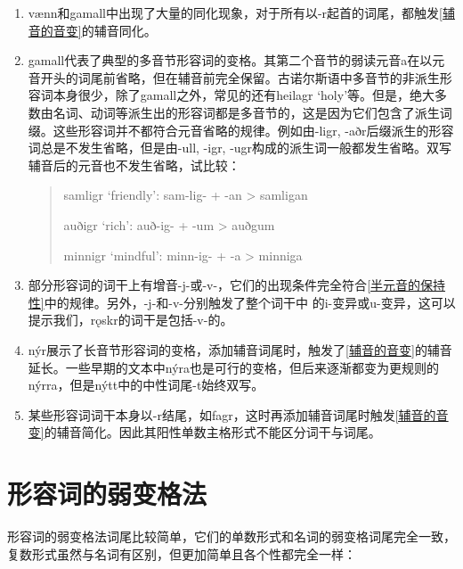 \begin{enumerate}
    \item
          vænn和gamall中出现了大量的同化现象，对于所有以-r起首的词尾，都触发\ref{辅音的音变}的辅音同化。
    \item
          gamall代表了典型的多音节形容词的变格。其第二个音节的弱读元音a在以元音开头的词尾前省略，但在辅音前完全保留。古诺尔斯语中多音节的非派生形容词本身很少，除了gamall之外，常见的还有heilagr `holy'等。但是，绝大多数由名词、动词等派生出的形容词都是多音节的，这是因为它们包含了派生词缀。这些形容词并不都符合元音省略的规律。例如由-ligr, -aðr后缀派生的形容词总是不发生省略，但是由-ull, -igr, -ugr构成的派生词一般都发生省略。双写辅音后的元音也不发生省略，试比较：

          \begin{quote}
              samligr `friendly': sam-lig- + -an > samligan

              auðigr `rich': auð-ig- + -um > auðgum

              minnigr `mindful': minn-ig- + -a > minniga
          \end{quote}

    \item
          部分形容词的词干上有增音-j-或-v-，它们的出现条件完全符合\ref{半元音的保持性}中的规律。另外，-j-和-v-分别触发了整个词干中
          的i-变异或u-变异，这可以提示我们，rǫskr的词干是包括-v-的。
    \item
          nýr展示了长音节形容词的变格，添加辅音词尾时，触发了\ref{辅音的音变}的辅音延长。一些早期的文本中nýra也是可行的变格，但后来逐渐都变为更规则的nýrra，但是nýtt中的中性词尾-t始终双写。
    \item
          某些形容词词干本身以-r结尾，如fagr，这时再添加辅音词尾时触发\ref{辅音的音变}的辅音简化。因此其阳性单数主格形式不能区分词干与词尾。
\end{enumerate}

\section{形容词的弱变格法}\label{形容词的弱变格法}

形容词的弱变格法词尾比较简单，它们的单数形式和名词的弱变格词尾完全一致，复数形式虽然与名词有区别，但更加简单且各个性都完全一样：

